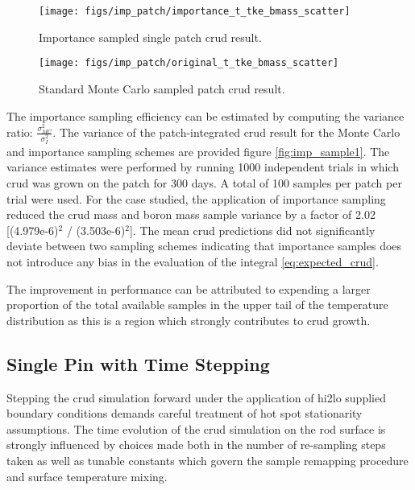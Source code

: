 \begin{figure}[H]
    \centering
    \texttt{[image: figs/imp\_patch/importance\_t\_tke\_bmass\_scatter]}
    \caption[Importance sampled single patch crud result.]{Importance sampled single patch crud result.}
    \label{fig:importancettkebmassscatter}
\end{figure}

\begin{figure}[H]
    \centering
    \texttt{[image: figs/imp\_patch/original\_t\_tke\_bmass\_scatter]}
    \caption[Standard Monte Carlo sampled patch crud result.]{Standard Monte Carlo sampled patch crud result.}
    \label{fig:originalttkebmassscatter}
\end{figure}

The importance sampling efficiency can be estimated by computing the variance ratio:  $\frac{\sigma^2_{MC}}{\sigma^2_{I}}$.  The variance of the patch-integrated crud result for the Monte Carlo and importance sampling schemes are provided figure \ref{fig:imp_sample1}.  The variance estimates were performed by running 1000 independent trials in which crud was grown on the patch for 300 days.  A total of 100 samples per patch per trial were used.  For the case studied, the application of importance sampling reduced the crud mass and boron mass sample variance by a factor of 2.02 [(4.979e-6)$^2$ / (3.503e-6)$^2$].  The mean crud predictions did not significantly deviate between two sampling schemes indicating that importance samples does not introduce any bias in the evaluation of the integral \ref{eq:expected_crud}.

The improvement in performance can be attributed to expending a larger proportion of the total available samples in the upper tail of the temperature distribution as this is a region which strongly contributes to crud growth.


\subsection{Single Pin with Time Stepping}

Stepping the crud simulation forward under the application of hi2lo supplied boundary conditions demands careful treatment of hot spot stationarity assumptions.  The time evolution of the crud simulation on the rod surface is strongly influenced by choices made both in the number of re-sampling steps taken as well as tunable constants which govern the sample remapping procedure and surface temperature mixing.

